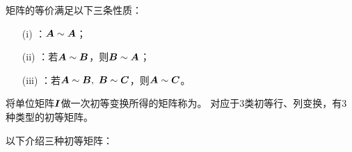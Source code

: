 \begin{xingzhi}
  矩阵的等价满足以下三条性质：
  \begin{itemize}
  \item[(i)] ：$\boldsymbol{A} \sim \boldsymbol{A}$；
  \item[(ii)] ：若$\boldsymbol{A} \sim \boldsymbol{B}$，则$\boldsymbol{B} \sim \boldsymbol{A}$；
  \item[(iii)] ：若$\boldsymbol{A} \sim \boldsymbol{B}, ~\boldsymbol{B} \sim \boldsymbol{C}$，则$\boldsymbol{A} \sim \boldsymbol{C}$。
  \end{itemize}
\end{xingzhi}

\begin{dingyi}[初等矩阵]
  将单位矩阵$\boldsymbol{I}$做一次初等变换所得的矩阵称为。
  对应于$3$类初等行、列变换，有$3$种类型的初等矩阵。
\end{dingyi}

以下介绍三种初等矩阵：

